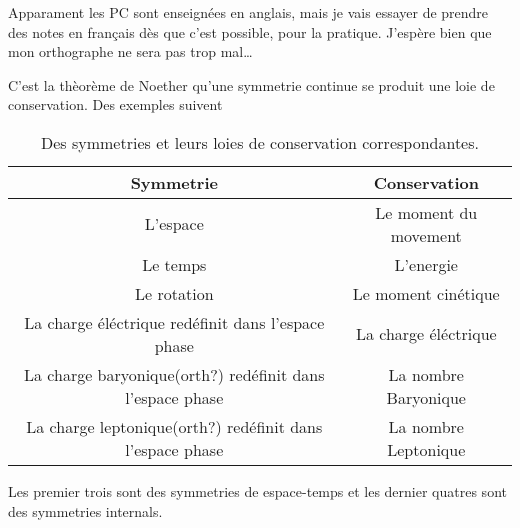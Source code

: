 \documentclass[10pt]{report}
\begin{document}
Apparament les PC sont enseign\'ees en anglais, mais je vais essayer de prendre des notes en fran\c{c}ais d\`es que c'est possible, pour la pratique. J'esp\`ere bien que mon orthographe ne sera pas trop mal\dots

C'est la th\`eor\`eme de Noether qu'une symmetrie continue se produit une loie de conservation. Des exemples suivent
\begin{table}[!h]
    \centering
    \begin{tabular}{c|c}
        Symmetrie & Conservation\\\hline
        L'espace & Le moment du movement\\
        Le temps & L'energie\\
        Le rotation & Le moment cin\'etique\\
        La charge \'el\'ectrique red\'efinit dans l'espace phase & La charge \'el\'ectrique\\
        La charge baryonique(orth?) red\'efinit dans l'espace phase & La nombre Baryonique \\
        La charge leptonique(orth?) red\'efinit dans l'espace phase & La nombre Leptonique
    \end{tabular}
    \caption{Des symmetries et leurs loies de conservation correspondantes.}
\end{table}

Les premier trois sont des symmetries de espace-temps et les dernier quatres sont des symmetries internals.
\end{document}
